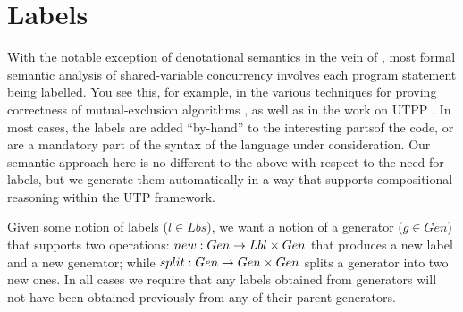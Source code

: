 \section{Labels}\label{sec:labels}

With the notable exception of denotational semantics
in the vein of \cite{DBLP:conf/lics/Brooks93},
most formal semantic analysis of shared-variable concurrency
involves each program statement being labelled.
You see this, for example, in the various techniques for proving correctness
of mutual-exclusion algorithms \cite{MUTEXPROOFS},
as well as in the work on UTPP \cite{DBLP:conf/icfem/WoodcockH02}.
In most cases, the labels are added ``by-hand''
to the interesting partsof the code,
or are a mandatory part of the syntax of the language under consideration.
Our semantic approach here is no different to the above with respect to
the need for labels,
but we generate them automatically
in a way that supports compositional reasoning within the UTP framework.

Given some notion of labels ($l \in Lbs$),
we want a notion of a generator ($g \in Gen$) that supports two operations:
$new:Gen \rightarrow Lbl \times Gen$ that produces a new label and a new generator;
while
$split:Gen \rightarrow Gen \times Gen$ splits a generator into two new ones.
In all cases we require that any labels obtained from generators
will not have been obtained previously from any of their parent generators.

